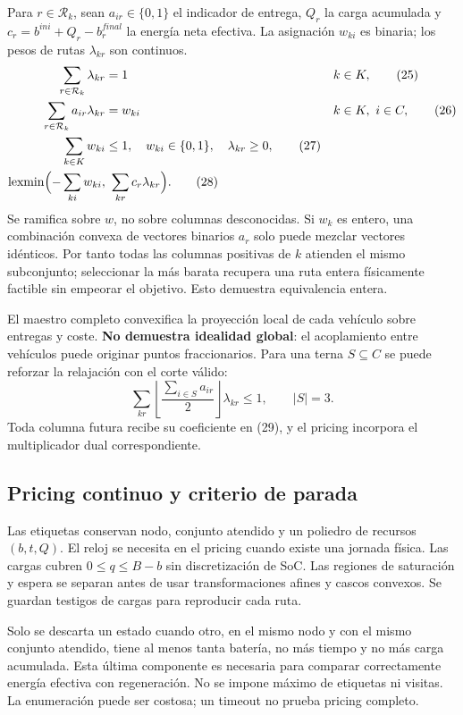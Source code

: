 \documentclass[11pt,a4paper]{article}
\begin{document}
Para $r\in\mathcal R_k$, sean $a_{ir}\in\{0,1\}$ el indicador de entrega,
$Q_r$ la carga acumulada y $c_r=b^{ini}+Q_r-b_r^{final}$ la energía neta efectiva.
La asignación $w_{ki}$ es binaria; los pesos de rutas $\lambda_{kr}$ son continuos.
\begin{align}
\sum_{r\in\mathcal R_k}\lambda_{kr}&=1 && k\in K, \tag{25}\\
\sum_{r\in\mathcal R_k}a_{ir}\lambda_{kr}&=w_{ki} && k\in K,\ i\in C, \tag{26}\\
\sum_{k\in K}w_{ki}&\le1,\quad w_{ki}\in\{0,1\},\quad\lambda_{kr}\ge0, \tag{27}\\
\operatorname{lexmin}\Bigl(-\sum_{ki}w_{ki},&
\ \sum_{kr}c_r\lambda_{kr}\Bigr). \tag{28}
\end{align}
Se ramifica sobre $w$, no sobre columnas desconocidas. Si $w_k$ es entero,
una combinación convexa de vectores binarios $a_r$ solo puede mezclar vectores
idénticos. Por tanto todas las columnas positivas de $k$ atienden el mismo
subconjunto; seleccionar la más barata recupera una ruta entera físicamente
factible sin empeorar el objetivo. Esto demuestra equivalencia entera.

El maestro completo convexifica la proyección local de cada vehículo sobre
entregas y coste. \textbf{No demuestra idealidad global}: el acoplamiento entre
vehículos puede originar puntos fraccionarios. Para una terna $S\subseteq C$ se
puede reforzar la relajación con el corte válido:
\begin{equation}
\sum_{kr}\left\lfloor\frac{\sum_{i\in S}a_{ir}}{2}\right\rfloor\lambda_{kr}
\le1,\qquad |S|=3. \tag{29}
\end{equation}
Toda columna futura recibe su coeficiente en (29), y el pricing incorpora
el multiplicador dual correspondiente.

\subsection{Pricing continuo y criterio de parada}
Las etiquetas conservan nodo, conjunto atendido y un poliedro de recursos
$(b,t,Q)$. El reloj se necesita en el pricing cuando existe una jornada física.
Las cargas cubren $0\le q\le B-b$ sin discretización de SoC. Las regiones de
saturación y espera se separan antes de usar transformaciones afines y cascos
convexos. Se guardan testigos de cargas para reproducir cada ruta.

Solo se descarta un estado cuando otro, en el mismo nodo y con el mismo
conjunto atendido, tiene al menos tanta batería, no más tiempo y no más carga
acumulada. Esta última componente es necesaria para comparar correctamente
energía efectiva con regeneración. No se impone máximo de etiquetas ni visitas.
La enumeración puede ser costosa; un timeout no prueba pricing completo.
\end{document}
